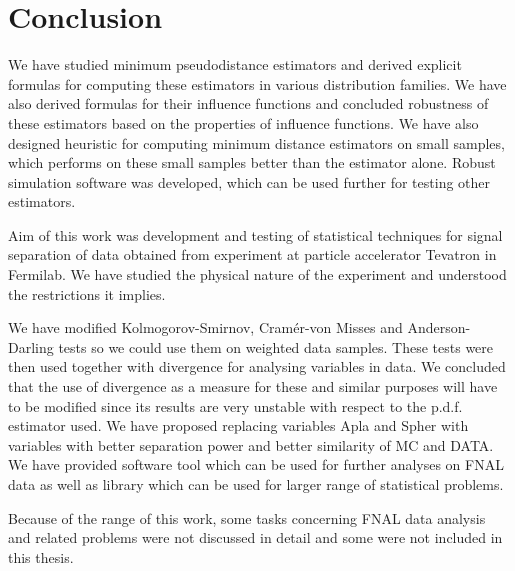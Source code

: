 \chapter*{Conclusion}

We have studied minimum \ren pseudodistance estimators and derived explicit formulas for computing these estimators in various distribution families. We have also derived formulas for their influence functions and concluded robustness of these estimators based on the properties of influence functions. We have also designed heuristic for computing minimum \ren distance estimators on small samples, which performs on these small samples better than the estimator alone. Robust simulation software was developed, which can be used further for testing other estimators. 

Aim of this work was development and testing of statistical techniques for signal separation of data obtained from \dzero experiment at particle accelerator Tevatron in Fermilab. We have studied the physical nature of the experiment and understood the restrictions it implies.

We have modified  Kolmogorov-Smirnov, Cram\'er-von Misses and Anderson-Darling tests so we could use them on weighted data samples. These tests were then used together with \ren divergence for analysing variables in \dzero data. We concluded that the use of \ren divergence as a measure for these and similar purposes will have to be modified since its results are very unstable with respect to the p.d.f. estimator used. We have proposed replacing variables \textsf{Apla} and \textsf{Spher} with variables with better separation power and better similarity of MC and DATA. We have provided software tool which can be used for further analyses on FNAL data as well as library which can be used for larger range of statistical problems.

Because of the range of this work, some tasks concerning FNAL data analysis and related problems were not discussed in detail and some were not included in this thesis.


